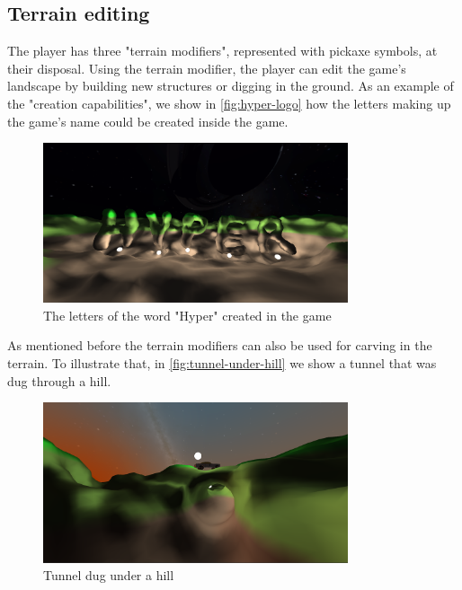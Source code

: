 \subsection{Terrain editing}
The player has three "terrain modifiers", represented with pickaxe symbols, at their disposal.
Using the terrain modifier, the player can edit the game's landscape by building new structures or digging in the ground.
As an example of the "creation capabilities", we show in \autoref{fig:hyper-logo} how the letters making up the game's name could be created inside the game.
\begin{figure}[!htb]
    \centering
    \includegraphics[width=0.8\textwidth]{chapters/results/sections/gameplay/resources/hyper-logo-night-2.png}
    \caption{The letters of the word "Hyper" created in the game}
    \label{fig:hyper-logo}
\end{figure}

As mentioned before the terrain modifiers can also be used for carving in the terrain.
To illustrate that, in \autoref{fig:tunnel-under-hill} we show a tunnel that was dug through a hill.
\begin{figure}[!htb]
    \centering
    \includegraphics[width=0.8\textwidth]{chapters/results/sections/gameplay/resources/tunnel-with-car.png}
    \caption{Tunnel dug under a hill}
    \label{fig:tunnel-under-hill}
\end{figure}
